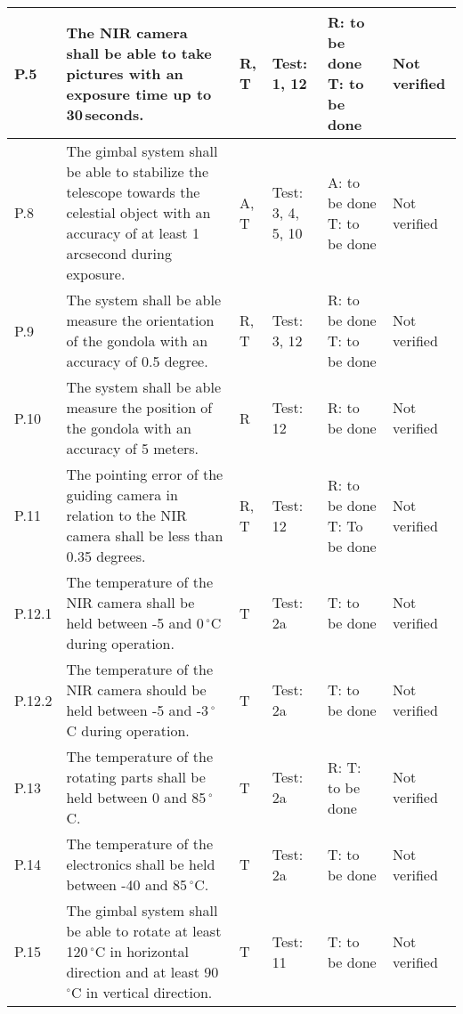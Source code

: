 \begin{longtable}[]{|m{}| m{}|m{}|m{}|m{}|m{}|}
P.5 & The NIR camera shall be able to take pictures with an exposure time up to 30\,seconds.
& R, T & Test: 1, 12 & R: to be done \newline T: to be done & Not verified \\\hline

  P.8 & The gimbal system shall be able to stabilize the telescope towards the celestial object with an accuracy of at least 1 arcsecond during exposure.
& A, T & Test: 3, 4, 5, 10 & A: to be done \newline T: to be done & Not verified \\\hline

  P.9 & The system shall be able measure the orientation of the gondola with an accuracy of 0.5 degree.
& R, T & Test: 3, 12 & R: to be done \newline T: to be done  & Not verified \\\hline

  P.10 & The system shall be able measure the position of the gondola with an accuracy of 5 meters.
& R & Test: 12 & R: to be done & Not verified \\\hline

  P.11 & The pointing error of the guiding camera in relation to the NIR camera shall be less than 0.35 degrees.
& R, T & Test: 12 & R: to be done \newline T: To be done& Not verified \\\hline

  P.12.1 & The temperature of the NIR camera shall be held between -5 and 0\,$^\circ$C during operation.
& T & Test: 2a & T: to be done & Not verified \\\hline

  P.12.2 & The temperature of the NIR camera should be held between -5 and -3\,$^\circ$C during operation.
& T & Test: 2a &  T: to be done & Not verified \\\hline

  P.13 & The temperature of the rotating parts shall be held between 0 and 85\,$^\circ$C.
& T & Test: 2a & R: T: to be done & Not verified \\\hline

  P.14 & The temperature of the electronics shall be held between -40 and 85\,$^\circ$C.
& T & Test: 2a & T: to be done & Not verified \\\hline

P.15 & The gimbal system shall be able to rotate at least 120\,$^\circ$C in horizontal direction and at least 90\,$^\circ$C in vertical direction.
& T & Test: 11 & T: to be done & Not verified \\\hline




\end{longtable}
